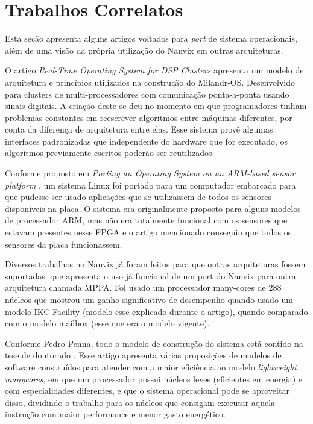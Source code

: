 \section{Trabalhos Correlatos}

Esta seção apresenta alguns artigos voltados para \textit{port} de sistema operacionais, além de uma visão da própria utilização do Nanvix em outras arquiteturas.

O artigo \emph{Real-Time Operating System for DSP Clusters} \cite{Drozdov2015RealTimeOS} apresenta um modelo de arquitetura e princípios utilizados na construção
do Milandr-OS. Desenvolvido para clusters de multi-processadores com comunicação ponta-a-ponta usando sinais digitais. A criação deste se deu no momento em
que programadores tinham problemas constantes em reescrever algoritmos entre máquinas diferentes, por conta da diferença de arquitetura entre elas. Esse sistema
provê algumas interfaces padronizadas que independente do hardware que for executado, os algoritmos previamente escritos poderão ser reutilizados.

Conforme proposto em \emph{Porting an Operating System on an ARM-based sensor platform} \cite{7372829}, um sistema Linux foi portado para um computador embarcado para
que pudesse ser usado aplicações que se utilizassem de todos os sensores disponíveis na placa. O sistema era originalmente proposto para alguns modelos de processador ARM, mas não era totalmente funcional com os sensores que estavam presentes nesse FPGA e o artigo mencionado conseguiu que todos os sensores da placa funcionassem.

Diversos trabalhos no Nanvix já foram feitos para que outras arquiteturas fossem suportadas. \cite{PENNA20211} que apresenta o uso já funcional de um port do 
Nanvix para outra arquitetura chamada MPPA. Foi usado um processador many-cores de 288 núcleos que mostrou um ganho significativo de desempenho quando usado um 
modelo IKC Facility (modelo esse explicado durante o artigo), quando comparado com o modelo mailbox (esse que era o modelo vigente).

Conforme Pedro Penna, todo o modelo de construção do sistema está contido na tese de doutorado \cite{penna:tel-03545212}. Esse artigo apresenta várias proposições 
de modelos de software construídos para atender com a maior eficiência ao modelo \emph{lightweight manycores}, em que um processador possui núcleos leves (eficientes em energia) e com especialidades diferentes, e que o sistema operacional pode se aproveitar disso, dividindo o trabalho para os núcleos que consigam executar aquela instrução com maior performance e menor gasto energético.

